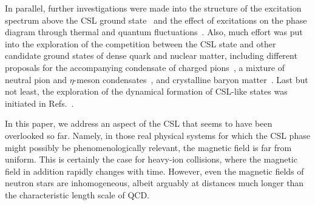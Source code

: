 \documentclass[pdflatex,iicol,sn-mathphys-num]{sn-jnl}
\begin{document}
In parallel, further investigations were made into the structure of the excitation spectrum above the CSL ground state~\cite{Yamamoto:2015maz,Ozaki:2016vwu,Brauner:2017mui} and the effect of excitations on the phase diagram through thermal and quantum fluctuations~\cite{Brauner:2021sci,Brauner:2023ort}. Also, much effort was put into the exploration of the competition between the CSL state and other candidate ground states of dense quark and nuclear matter, including different proposals for the accompanying condensate of charged pions~\cite{Evans:2022hwr,Eto:2025fkt,Eto:2023wul,Evans:2023hms}, a mixture of neutral pion and $\eta$-meson condensates~\cite{Qiu:2023guy}, and crystalline baryon matter~\cite{Chen:2021vou,Qiu:2024zpg,Amari:2025twm}. Last but not least, the exploration of the dynamical formation of CSL-like states was initiated in Refs.~\cite{Eto:2022lhu,Higaki:2022gnw,Nishimura:2023czx,Eto:2025ebz}.

In this paper, we address an aspect of the CSL that seems to have been overlooked so far. Namely, in those real physical systems for which the CSL phase might possibly be phenomenologically relevant, the magnetic field is far from uniform. This is certainly the case for heavy-ion collisions, where the magnetic field in addition rapidly changes with time. However, even the magnetic fields of neutron stars are inhomogeneous, albeit arguably at distances much longer than the characteristic length scale of QCD.
\end{document}
